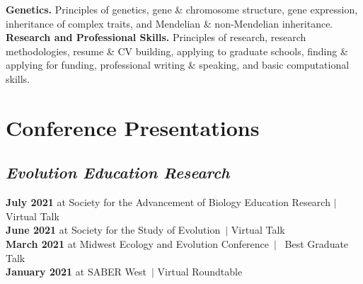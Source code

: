 \documentclass[]{article}
\begin{document}
\textbf{Genetics.} Principles of genetics, gene \& chromosome structure, gene expression, inheritance of complex traits, and Mendelian \& non-Mendelian inheritance.\\

\textbf{Research and Professional Skills.} Principles of research, research methodologies, resume \& CV building, applying to graduate schools, finding \& applying for funding, professional writing \& speaking, and basic computational skills.

\vspace{5mm}

\section{\fontsize{16}{48}\selectfont Conference Presentations}
\vspace{-5mm}

\subsection{\fontsize{12}{36}\selectfont \textit{Evolution Education Research}}

\textbf{July 2021} at Society for the Advancement of Biology Education Research $\vert$ Virtual Talk \hspace{0.3mm} \href{https://uofi.box.com/v/2021saber-talk}{\faVideo} \href{https://ledelaney.org/talks/2021saber}{\faImages} \href{https://github.com/ledelaney/07-21-SABER}{\faGithub}\\
\textbf{June 2021} at Society for the Study of Evolution\ $\vert$ Virtual Talk \hspace{0.3mm} \href{https://uofi.box.com/v/2021evolution}{\faVideo} \href{https://ledelaney.org/talks/2021evolution}{\faImages} \href{https://github.com/ledelaney/06-21-Evolution}{\faGithub}\\
\textbf{March 2021} at Midwest Ecology and Evolution Conference\ $\vert$ \faAward\ Best Graduate Talk\ \hspace{0.1mm} \href{https://uofi.box.com/v/2021meec-talk}{\faVideo} \href{https://ledelaney.org/talks/2021meec/}{\faImages} \href{https://github.com/ledelaney/03-21-MEEC}{\faGithub}\\
\textbf{January 2021} at SABER West\ $\vert$ Virtual Roundtable \hspace{0.4mm} \href{https://ledelaney.org/talks/2021saberw/}{\faImages} \href{https://github.com/ledelaney/01-21-SABERwest}{\faGithub}

\vspace{-5mm}
\end{document}
